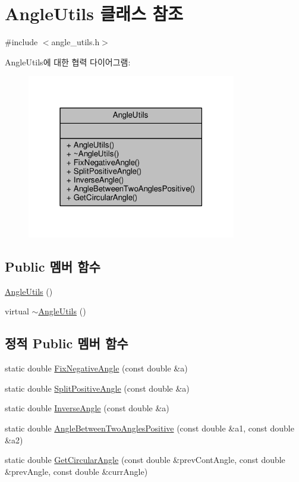 \hypertarget{class_angle_utils}{}\section{Angle\+Utils 클래스 참조}
\label{class_angle_utils}


{\ttfamily \#include $<$angle\+\_\+utils.\+h$>$}



Angle\+Utils에 대한 협력 다이어그램\+:\nopagebreak
\begin{figure}[H]
\begin{center}
\leavevmode
\includegraphics[width=259pt]{class_angle_utils__coll__graph}
\end{center}
\end{figure}
\subsection*{Public 멤버 함수}
\begin{DoxyCompactItemize}
\item 
\hyperlink{class_angle_utils_a244b7e39d429d0667180ee1f6c4688dc}{Angle\+Utils} ()
\item 
virtual \hyperlink{class_angle_utils_afd7d97d10e25e67dfad8a3700168f796}{$\sim$\+Angle\+Utils} ()
\end{DoxyCompactItemize}
\subsection*{정적 Public 멤버 함수}
\begin{DoxyCompactItemize}
\item 
static double \hyperlink{class_angle_utils_a27d9bd3a5b5816f9b94dbdadc785a75d}{Fix\+Negative\+Angle} (const double \&a)
\item 
static double \hyperlink{class_angle_utils_a91f3e34c9e1e35788d44a2f6bc5bc206}{Split\+Positive\+Angle} (const double \&a)
\item 
static double \hyperlink{class_angle_utils_a90a3b153450f72621fa4d601630f7999}{Inverse\+Angle} (const double \&a)
\item 
static double \hyperlink{class_angle_utils_aa9a3fb876a9b6d446a8033d2f901bb73}{Angle\+Between\+Two\+Angles\+Positive} (const double \&a1, const double \&a2)
\item 
static double \hyperlink{class_angle_utils_a5a51b312ed27e10ab9af2e092a897da7}{Get\+Circular\+Angle} (const double \&prev\+Cont\+Angle, const double \&prev\+Angle, const double \&curr\+Angle)
\end{DoxyCompactItemize}


